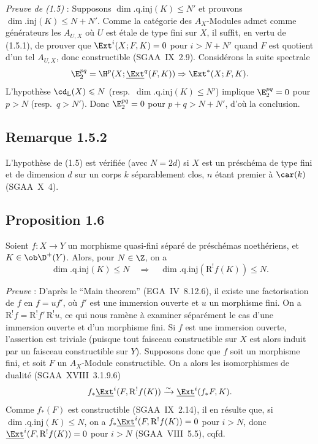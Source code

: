 \emph{Preuve de (1.5)} : Supposons $\dim.\mathrm{q.inj}(K) \leqslant N'$ et prouvons $\dim.\mathrm{inj}(K) \leqslant N + N'$. Comme la catégorie des $A_X$-Modules admet comme générateurs les $A_{U,X}$ où $U$ est étale de type fini sur $X$, il suffit, en vertu de (1.5.1), de prouver que $\Ext^i(X; F,K) = 0$ pour $i > N + N'$ quand $F$ est quotient d'un tel $A_{U,X}$, donc constructible (SGAA~IX~2.9). Considérons la suite spectrale
\[
\E_2^{pq} = \H^p(X; \underline{\Ext}^q(F,K)) \Rightarrow \Ext^{*}(X; F,K).
\]
L'hypothèse $\cd_{\mathbb{L}}(X) \leqslant N$ (resp.~$\dim.\mathrm{q.inj}(K) \leqslant N'$) implique $\E_2^{pq} = 0$ pour $p > N$ (resp.~$q > N'$). Donc $\E_2^{pq} = 0$ pour $p+q > N+N'$, d'où la conclusion.

\subsection*{Remarque 1.5.2}
L'hypothèse de (1.5) est vérifiée (avec $N = 2d$) si $X$ est un préschéma de type fini et de dimension $d$ sur un corps $k$ séparablement clos, $n$ étant premier à $\car(k)$ (SGAA~X~4).

\subsection*{Proposition 1.6}
Soient $f : X \to Y$ un morphisme quasi-fini séparé de préschémas noethériens, et $K \in \ob \D^{+}(Y)$. Alors, pour $N \in \Z$, on a
\[
\dim.\mathrm{q.inj}(K) \leqslant N \quad \Longrightarrow \quad \dim.\mathrm{q.inj}(\mathrm{R}^{!}f(K)) \leqslant N.
\]

\emph{Preuve} : D'après le ``Main theorem'' (EGA~IV~8.12.6), il existe une factorisation de $f$ en $f = uf'$, où $f'$ est une immersion ouverte et $u$ un morphisme fini. On a $\mathrm{R}^{!}f = \mathrm{R}^{!}f' \, \mathrm{R}^{!}u$, ce qui nous ramène à examiner séparément le cas d'une immersion ouverte et d'un morphisme fini. Si $f$ est une immersion ouverte, l'assertion est triviale (puisque tout faisceau constructible sur $X$ est alors induit par un faisceau constructible sur $Y$). Supposons donc que $f$ soit un morphisme fini, et soit $F$ un $A_X$-Module constructible. On a alors les isomorphismes de dualité (SGAA~XVIII~3.1.9.6)
\[
f_{*}\underline{\Ext}^i(F, \mathrm{R}^{!}f(K)) \xrightarrow{\sim} \underline{\Ext}^i(f_{*}F, K).
\]
Comme $f_{*}(F)$ est constructible (SGAA~IX~2.14), il en résulte que, si $\dim.\mathrm{q.inj}(K) \leqslant N$, on a $f_{*}\underline{\Ext}^i(F, \mathrm{R}^{!}f(K)) = 0$ pour $i > N$, donc $\underline{\Ext}^i(F, \mathrm{R}^{!}f(K)) = 0$ pour $i > N$ (SGAA~VIII~5.5), cqfd.

